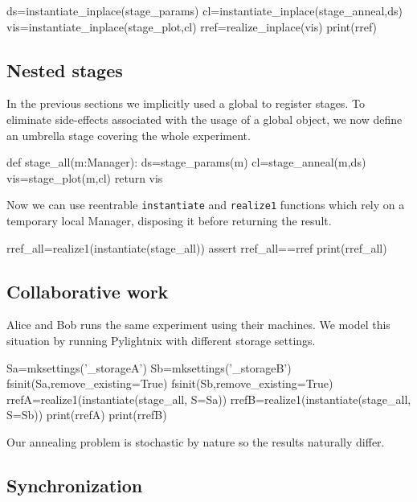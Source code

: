 \begin{pythontexcode}
ds=instantiate_inplace(stage_params)
cl=instantiate_inplace(stage_anneal,ds)
vis=instantiate_inplace(stage_plot,cl)
rref=realize_inplace(vis)
print(rref)
\end{pythontexcode}

\mystdout

\subsection{Nested stages}

In the previous sections we implicitly used a global
 to register stages. To eliminate
side-effects associated with the usage of a global object, we now define an
umbrella stage covering the whole experiment.

\begin{pythontexcode}
def stage_all(m:Manager):
  ds=stage_params(m)
  cl=stage_anneal(m,ds)
  vis=stage_plot(m,cl)
  return vis
\end{pythontexcode}

Now we can use reentrable \texttt{instantiate} and \texttt{realize1}
functions which rely on a temporary local Manager, disposing it before
returning the result.

\begin{pythontexcode}
rref_all=realize1(instantiate(stage_all))
assert rref_all==rref
print(rref_all)
\end{pythontexcode}

\mystdout


\subsection{Collaborative work}

Alice and Bob runs the same experiment using their machines. We model
this situation by running Pylightnix with different storage settings.

\begin{pythontexcode}
Sa=mksettings('_storageA')
Sb=mksettings('_storageB')
fsinit(Sa,remove_existing=True)
fsinit(Sb,remove_existing=True)
rrefA=realize1(instantiate(stage_all, S=Sa))
rrefB=realize1(instantiate(stage_all, S=Sb))
print(rrefA)
print(rrefB)
\end{pythontexcode}

Our annealing problem is stochastic by nature so the results naturally differ.

\subsection{Synchronization}

